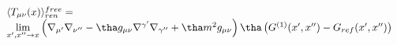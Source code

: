 \begin{equation}
  \begin{array}{l}
 \langle T_{\mu\nu}(x)\rangle_{ren}^{free} = \\
  {\displaystyle \lim_{x',x''\rightarrow x}} 
  \left(\nabla_{\mu'}\nabla_{\nu''} 
  -\tha g_{\mu\nu}\nabla^{\gamma'}\nabla_{\gamma''}+ \tha m^2 g_{\mu\nu}\right)
  \tha \left( G^{(1)}(x',x'')- G_{ref}(x',x'')\right)
  \end{array}
\end{equation}

